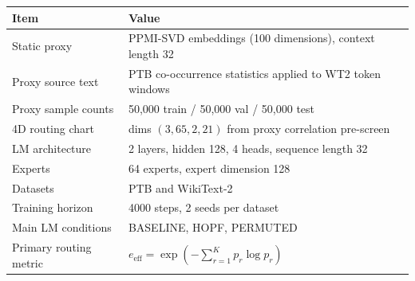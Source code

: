 \begin{tabular}{ll}
\toprule
Item & Value \\
\midrule
Static proxy & PPMI-SVD embeddings (100 dimensions), context length 32 \\
Proxy source text & PTB co-occurrence statistics applied to WT2 token windows \\
Proxy sample counts & 50{,}000 train / 50{,}000 val / 50{,}000 test \\
4D routing chart & dims $(3,65,2,21)$ from proxy correlation pre-screen \\
LM architecture & 2 layers, hidden 128, 4 heads, sequence length 32 \\
Experts & 64 experts, expert dimension 128 \\
Datasets & PTB and WikiText-2 \\
Training horizon & 4000 steps, 2 seeds per dataset \\
Main LM conditions & BASELINE, HOPF, PERMUTED \\
Primary routing metric & $e_{\mathrm{eff}} = \exp\!\left(-\sum_{r=1}^{K} p_r \log p_r\right)$ \\
\bottomrule
\end{tabular}
